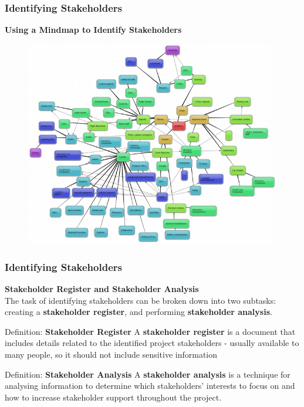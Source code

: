 \documentclass[aspectratio=169]{beamer}
\begin{document}
\begin{frame}
\frametitle{Identifying Stakeholders}
\textbf{Using a Mindmap to Identify Stakeholders}
\begin{figure}
\includegraphics[scale=0.45]{mind_map_stakeholder}
\end{figure}
\end{frame}

\begin{frame}
\frametitle{Identifying Stakeholders}
\textbf{Stakeholder Register and Stakeholder Analysis}\\
\vspace{0.5cm}
The task of identifying stakeholders can be broken down into two subtasks: creating a \textbf{stakeholder register}, and performing \textbf{stakeholder analysis}.
\vspace{0.5cm}
\begin{block}{Definition: \textbf{Stakeholder Register}}
A \textbf{stakeholder register} is a document that includes details related to the identified project stakeholders - usually available to many people, so it should not include sensitive information
\end{block}
\vspace{0.2cm}
\begin{block}{Definition: \textbf{Stakeholder Analysis}}
A \textbf{stakeholder analysis} is a technique for analysing information to determine which stakeholders' interests to focus on and how to increase stakeholder support throughout the project.
\end{block}
\end{frame}
\end{document}
